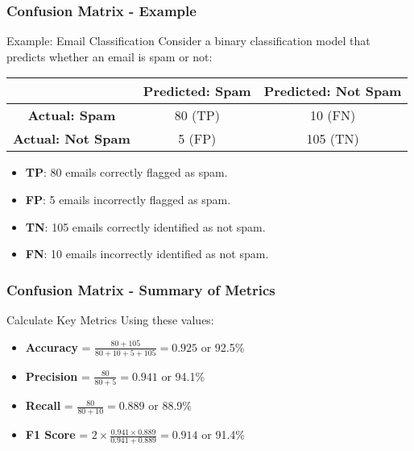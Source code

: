 \documentclass[aspectratio=169]{beamer}
\begin{document}
\begin{frame}[fragile]
    \frametitle{Confusion Matrix - Example}
    \begin{block}{Example: Email Classification}
        Consider a binary classification model that predicts whether an email is spam or not:
        \begin{center}
            \begin{tabular}{|c|c|c|}
                \hline
                & \textbf{Predicted: Spam} & \textbf{Predicted: Not Spam} \\
                \hline
                \textbf{Actual: Spam} & 80 (TP) & 10 (FN) \\
                \hline
                \textbf{Actual: Not Spam} & 5 (FP) & 105 (TN) \\
                \hline
            \end{tabular}
        \end{center}
        \begin{itemize}
            \item \textbf{TP}: 80 emails correctly flagged as spam.
            \item \textbf{FP}: 5 emails incorrectly flagged as spam.
            \item \textbf{TN}: 105 emails correctly identified as not spam.
            \item \textbf{FN}: 10 emails incorrectly identified as not spam.
        \end{itemize}
    \end{block}
\end{frame}

\begin{frame}[fragile]
    \frametitle{Confusion Matrix - Summary of Metrics}
    \begin{block}{Calculate Key Metrics}
        Using these values:
        \begin{itemize}
            \item \textbf{Accuracy} = \( \frac{80 + 105}{80 + 10 + 5 + 105} = 0.925 \) or 92.5\%
            \item \textbf{Precision} = \( \frac{80}{80 + 5} = 0.941 \) or 94.1\%
            \item \textbf{Recall} = \( \frac{80}{80 + 10} = 0.889 \) or 88.9\%
            \item \textbf{F1 Score} = \( 2 \times \frac{0.941 \times 0.889}{0.941 + 0.889} = 0.914 \) or 91.4\%
        \end{itemize}
    \end{block}
\end{frame}
\end{document}
